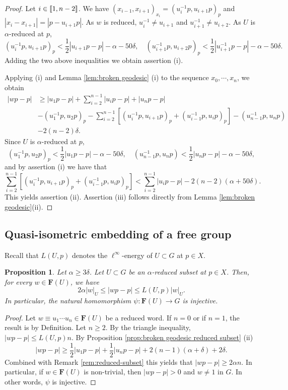 \documentclass[leqno,a4paper,10pt]{amsart}
\theoremstyle{plain}
\newtheorem{prop}[thm]{Proposition}
\theoremstyle{definition}
\theoremstyle{remark}
\newcommand{\F}{\mathbf{F}}
\let\le\leqslant
\let\ge\geqslant
\newcommand{\zinterval}[2]{
	\mathchoice%
	{\left \llbracket #1, \cdots, #2 \right \rrbracket}%
	{\llbracket #1, #2 \rrbracket}%
	{\llbracket #1, #2 \rrbracket}%
	{\llbracket #1, #2 \rrbracket}%
}
\begin{document}
\begin{proof}
	 Let $i\in\zinterval{1}{n-2}$. We have
	$(x_{i-1},x_{i+1})_{x_i}=(u_{i}^{-1}p,u_{i+1}p)_p$ 
	and $|x_i-x_{i+1}|=|p-u_{i+1}p|$. As $w$ is reduced, $u_i^{-1}\neq u_{i+1}$ and $u_{i+1}^{-1}\neq u_{i+2}$. As $U$ is $\alpha$-reduced at $p$, 
	$$(u_i^{-1}p, u_{i+1}p)_p<\frac{1}{2}|u_{i+1}p-p|-\alpha-50\delta,\quad
	(u_{i+1}^{-1}p, u_{i+2}p)_p<\frac{1}{2}|u_{i+1}^{-1}p-p|-\alpha-50\delta.$$
	Adding the two above inequalities we obtain assertion (i). 
	
Applying (i) and Lemma \ref{lem:broken geodesic} (i) to the sequence $x_0,\cdots, x_n$, we obtain
	\begin{align*}
		|wp-p|&\ge |u_1p-p|+\sum_{i=2}^{n-1}|u_{i}p-p|+|u_np-p|\\
		&-(u_1^{-1}p,u_{2}p)_p
		-\sum_{i=2}^{n-1}[(u_i^{-1}p,u_{i+1}p)_p+(u_{i-1}^{-1}p,u_{i}p)_p]-(u_{n-1}^{-1}p,u_np)\\
		&-2(n-2)\delta.
	\end{align*}
	Since $U$ is $\alpha$-reduced at $p$,
		$$(u_1^{-1}p,u_{2}p)_p<\frac{1}{2}|u_1p-p|-\alpha-50\delta,\quad (u_{n-1}^{-1}p,u_np)<\frac{1}{2}|u_np-p|-\alpha-50\delta,$$
and by assertion (i) we have that
$$\sum_{i=2}^{n-1}[(u_i^{-1}p,u_{i+1}p)_p+(u_{i-1}^{-1}p,u_{i}p)_p]< \sum_{i=2}^{n-1}|u_ip-p|-2(n-2)(\alpha+50\delta).$$
This yields assertion (ii). Assertion (iii) follows directly from Lemma \ref{lem:broken geodesic}(ii).
\end{proof}


\subsection{Quasi-isometric embedding of a free group}

Recall that $L(U,p)$ denotes the $\ell^{\infty}$-energy of $U\subset G$ at $p\in X$.


\begin{prop}
	\label{prop:reduced subset qi embedding} Let $\alpha\geqslant 3\delta$. 
	Let $U\subset G$ be an $\alpha$-reduced subset at $p\in X$. Then, for every $w\in \F(U)$, we have
	$$2\alpha|w|_U\le |wp-p|  \le L(U,p)|w|_U.$$
	In particular, the natural homomorphism $\psi\colon \F(U)\to G$ is injective.
\end{prop}

\begin{proof}
	Let $w\equiv u_1\cdots u_n \in \F(U)$ be a reduced word. If $n=0$ or if $n=1$, the result is by Definition. Let $n\ge 2$. By the triangle inequality, $|wp-p|\le L(U,p)n$. By Proposition \ref{prop:broken geodesic reduced subset} (ii) 
	$$|wp-p|\ge \frac{1}{2}|u_1p-p|+\frac{1}{2}|u_np-p|+2(n-1)(\alpha+\delta)+2\delta.$$
	Combined with Remark \ref{rem:reduced-subset} this yields that $|wp-p|\ge 2\alpha n.$
		In particular, if $w\in \F(U)$ is non-trivial, then $|wp-p|>0$ and $w\neq 1$ in $G$. In other words, $\psi $ is injective.
\end{proof}
\end{document}
